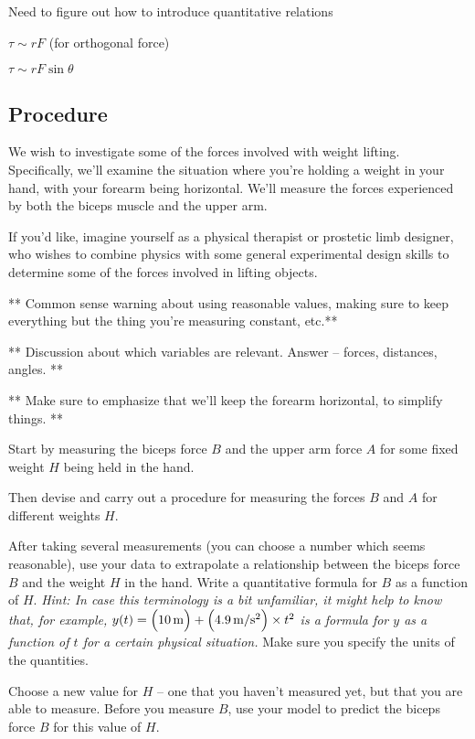 \documentclass[11pt,letterpaper]{article}
\begin{document}
Need to figure out how to introduce quantitative relations
\itemb
	\item $\tau \sim rF$ (for orthogonal force)
	\item $\tau \sim rF\sin\theta$
\iteme

\subsection*{Procedure}
We wish to investigate some of the forces involved with weight lifting.
Specifically, we'll examine the situation where you're holding a weight in your
hand, with your forearm being horizontal.
We'll measure the forces experienced by both the biceps muscle
and the upper arm.

If you'd like, imagine yourself as a 
physical therapist or prostetic limb designer,
who wishes to combine physics with some 
general experimental design skills to determine 
some of the forces involved in lifting objects.

** Common sense warning about using reasonable values, 
making sure to keep everything but the thing you're measuring constant, etc.**

** Discussion about which variables are relevant.  Answer -- forces, distances,
angles. **

** Make sure to emphasize that we'll keep the forearm horizontal, 
to simplify things. **

Start by measuring the biceps force $B$ and the upper arm force $A$ 
for some fixed weight $H$ being held in the hand.

Then devise and carry out a procedure for measuring the forces $B$ and $A$ for
different weights $H$.

After taking several measurements (you can choose a number which seems
reasonable), use your data to extrapolate a relationship between the biceps
force $B$ and the weight $H$ in the hand.  
Write a quantitative formula for $B$ as a function of $H$.
\emph{Hint:  In case this terminology is a bit unfamiliar, 
it might help to know that, for example, 
$y(t) = \Bigl( 10\,\mathrm{m} \Bigr) +\Bigl( 4.9\,\mathrm{m/s^2} \Bigr)\times t^2$ 
is a formula for $y$ as a function of $t$ for a certain physical situation.}
Make sure you specify the units of the quantities.

Choose a new value for $H$ -- one that you haven't measured yet,
but that you are able to measure.  
Before you measure $B$, use your model to predict the biceps force $B$ 
for this value of $H$.
\end{document}
